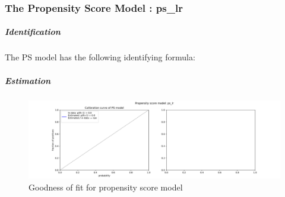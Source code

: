 \usepackage{longtable}\subsubsection{The Propensity Score Model : ps_lr}
\subparagraph{Identification}
The PS model has the following identifying formula: \subparagraph{Estimation}
\begin{figure}\centering\includegraphics[width=0.5 \textwidth]{img/model_report_Propensity Score Model Training.png}\caption{Goodness of fit for propensity score model}\label{fig:img/model_report_Propensity Score Model Training.png}\end{figure}